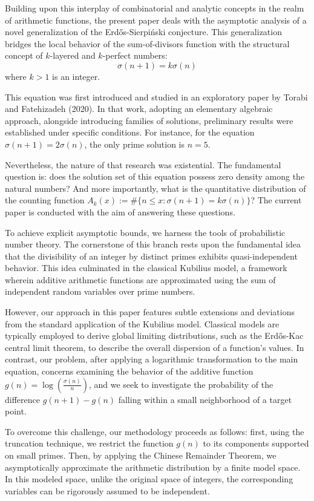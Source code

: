 \documentclass[12pt, a4paper]{article}
\theoremstyle{plain}
\theoremstyle{definition}
\begin{document}
Building upon this interplay of combinatorial and analytic concepts in the realm of arithmetic functions, the present paper deals with the asymptotic analysis of a novel generalization of the Erdős-Sierpiński conjecture. This generalization bridges the local behavior of the sum-of-divisors function with the structural concept of $k$-layered and $k$-perfect numbers:
\[ \sigma(n + 1) = k\sigma(n) \]
where $k > 1$ is an integer.

This equation was first introduced and studied in an exploratory paper by Torabi and Fatehizadeh (2020). In that work, adopting an elementary algebraic approach, alongside introducing families of solutions, preliminary results were established under specific conditions. For instance, for the equation $\sigma(n + 1) = 2\sigma(n)$, the only prime solution is $n = 5$.

Nevertheless, the nature of that research was existential. The fundamental question is: does the solution set of this equation possess zero density among the natural numbers? And more importantly, what is the quantitative distribution of the counting function $A_k(x) := \text{\#}\{n \leq x : \sigma(n + 1) = k\sigma(n)\}$? The current paper is conducted with the aim of answering these questions.

To achieve explicit asymptotic bounds, we harness the tools of probabilistic number theory. The cornerstone of this branch rests upon the fundamental idea that the divisibility of an integer by distinct primes exhibits quasi-independent behavior. This idea culminated in the classical Kubilius model, a framework wherein additive arithmetic functions are approximated using the sum of independent random variables over prime numbers.

However, our approach in this paper features subtle extensions and deviations from the standard application of the Kubilius model. Classical models are typically employed to derive global limiting distributions, such as the Erdős-Kac central limit theorem, to describe the overall dispersion of a function's values. In contrast, our problem, after applying a logarithmic transformation to the main equation, concerns examining the behavior of the additive function $g(n) = \log \left(\frac{\sigma(n)}{n}\right)$, and we seek to investigate the probability of the difference $g(n + 1) - g(n)$ falling within a small neighborhood of a target point.

To overcome this challenge, our methodology proceeds as follows: first, using the truncation technique, we restrict the function $g(n)$ to its components supported on small primes. Then, by applying the Chinese Remainder Theorem, we asymptotically approximate the arithmetic distribution by a finite model space. In this modeled space, unlike the original space of integers, the corresponding variables can be rigorously assumed to be independent.
\end{document}
